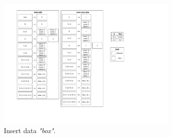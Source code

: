 \begin{figure}[h]
\centering
\includegraphics[width=0.8\textwidth]{./algorithm/string/pic/insertion/example_2_v5.pdf}
\caption{Insert data \textit{"box"}.}
\label{fig:algorithm:string:insertion:example_2}
\end{figure}

